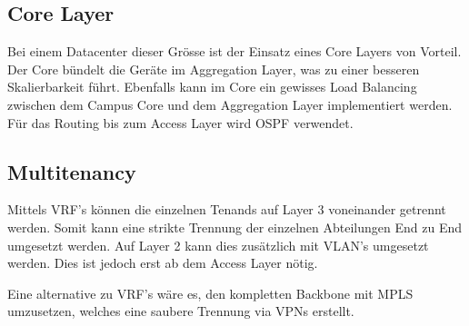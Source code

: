 \subsection{Core Layer}
Bei einem Datacenter dieser Grösse ist der Einsatz eines Core Layers von Vorteil. Der Core bündelt die Geräte im Aggregation Layer, was zu einer besseren Skalierbarkeit führt. Ebenfalls kann im Core ein gewisses Load Balancing zwischen dem Campus Core und dem Aggregation Layer implementiert werden. Für das Routing bis zum Access Layer wird OSPF verwendet.  


\subsection{Multitenancy}
Mittels VRF's können die einzelnen Tenands auf Layer 3 voneinander getrennt werden. Somit kann eine strikte Trennung der einzelnen Abteilungen End zu End umgesetzt werden. Auf Layer 2 kann dies zusätzlich mit VLAN's umgesetzt werden. Dies ist jedoch erst ab dem Access Layer nötig.

Eine alternative zu VRF's wäre es, den kompletten Backbone mit MPLS umzusetzen, welches eine saubere Trennung via VPNs erstellt.



